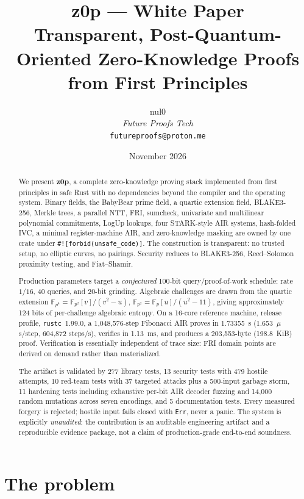 \documentclass[11pt,a4paper]{article}
\title{\textbf{z0p --- White Paper}\\[4pt]
\large Transparent, Post-Quantum-Oriented Zero-Knowledge Proofs\\from First Principles}
\author{nul0 \\ \textit{Future Proofs Tech} \\ \texttt{futureproofs@proton.me}}
\date{November 2026}
\newcommand{\wFp}{\mathbb{F}_p}
\newcommand{\wFpTwo}{\mathbb{F}_{p^2}}
\newcommand{\wFpFour}{\mathbb{F}_{p^4}}
\begin{document}
\maketitle

\begin{abstract}
We present \textbf{z0p}, a complete zero-knowledge proving stack implemented
from first principles in safe Rust with no dependencies beyond the compiler
and the operating system. Binary fields, the BabyBear prime field, a quartic
extension field, BLAKE3-256, Merkle trees, a parallel NTT, FRI, sumcheck,
univariate and multilinear polynomial commitments, LogUp lookups, four
STARK-style AIR systems, hash-folded IVC, a minimal register-machine AIR, and
zero-knowledge masking are owned by one crate under
\texttt{\#![forbid(unsafe\_code)]}. The construction is transparent: no
trusted setup, no elliptic curves, no pairings. Security reduces to
BLAKE3-256, Reed--Solomon proximity testing, and Fiat--Shamir.

Production parameters target a \emph{conjectured} 100-bit
query/proof-of-work schedule: rate $1/16$, 40 queries, and 20-bit grinding.
Algebraic challenges are drawn from the quartic extension
$\wFpFour=\wFpTwo[v]/(v^2-u)$, $\wFpTwo=\wFp[u]/(u^2-11)$, giving
approximately 124 bits of per-challenge algebraic entropy. On a 16-core
reference machine, release profile, \texttt{rustc}~1.99.0, a 1,048,576-step
Fibonacci AIR proves in 1.73355~s (1.653~$\mu$s/step, 604,872 steps/s),
verifies in 1.13~ms, and produces a 203,553-byte (198.8~KiB) proof.
Verification is essentially independent of trace size: FRI domain points are
derived on demand rather than materialized.

The artifact is validated by 277 library tests, 13 security tests with 479
hostile attempts, 10 red-team tests with 37 targeted attacks plus a
500-input garbage storm, 11 hardening tests including exhaustive per-bit AIR
decoder fuzzing and 14,000 random mutations across seven encodings, and 5
documentation tests. Every measured forgery is rejected; hostile input fails
closed with \texttt{Err}, never a panic. The system is explicitly
\emph{unaudited}: the contribution is an auditable engineering artifact and a
reproducible evidence package, not a claim of production-grade end-to-end
soundness.
\end{abstract}

\tableofcontents

\section{The problem}
\end{document}
